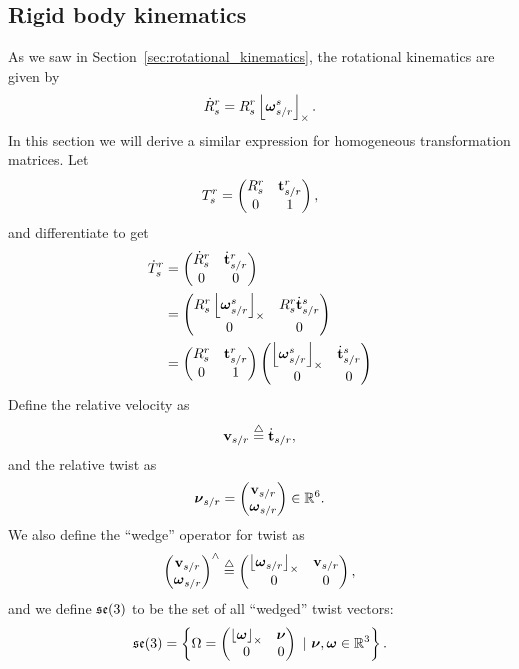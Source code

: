 \subsection{Rigid body kinematics}
As we saw in Section~\ref{sec:rotational_kinematics}, the rotational kinematics are given by
\begin{equation}\label{eq:rotational_dynamics_kinematics}
\dot{R}_s^r = R_s^r \ss{\omegabf_{s/r}^s}.
\end{equation}
In this section we will derive a similar expression for homogeneous transformation matrices.  
Let
\[
T_s^r = \begin{pmatrix} R_s^r & \mathbf{t}_{s/r}^r \\ 0 & 1 \end{pmatrix},
\]
and differentiate to get
\begin{align*}
\dot{T}_s^r &= \begin{pmatrix} \dot{R}_s^r & \dot{\mathbf{t}}_{s/r}^r \\ 0 & 0 \end{pmatrix} \\
&= \begin{pmatrix} R_s^r\left\lfloor\boldsymbol{\omega}_{s/r}^s\right\rfloor_{\times} & R_s^r\dot{\mathbf{t}}_{s/r}^s \\ 0 & 0 \end{pmatrix} \\
&= \begin{pmatrix} R_s^r & \mathbf{t}_{s/r}^r \\ 0 & 1 \end{pmatrix} \begin{pmatrix} \left\lfloor\boldsymbol{\omega}_{s/r}^s\right\rfloor_{\times} & \dot{\mathbf{t}}_{s/r}^s \\ 0 & 0 \end{pmatrix}
\end{align*}
Define the relative velocity as
\[
\mathbf{v}_{s/r} \stackrel{\triangle}{=} \dot{\mathbf{t}}_{s/r},
\]
and the relative twist as
\[
\boldsymbol{\nu}_{s/r} = \begin{pmatrix} \mathbf{v}_{s/r} \\ \boldsymbol{\omega}_{s/r} \end{pmatrix} \in \mathbb{R}^6.
\]
We also define the ``wedge'' operator for twist as 
\[
\begin{pmatrix} \mathbf{v}_{s/r} \\ \boldsymbol{\omega}_{s/r} \end{pmatrix}^\wedge \stackrel{\triangle}{=} \begin{pmatrix} \left\lfloor\boldsymbol{\omega}_{s/r}\right\rfloor_{\times} & \mathbf{v}_{s/r} \\ 0 & 0 \end{pmatrix},
\]
and we define $\mathfrak{se}(3)$ to be the set of all ``wedged'' twist vectors:
\[
\mathfrak{se}(3) = \left\{ \Omega = \begin{pmatrix}\left\lfloor\boldsymbol{\omega}\right\rfloor_{\times} & \boldsymbol{\nu} \\ 0 & 0\end{pmatrix} ~|~ \boldsymbol{\nu}, \boldsymbol{\omega} \in \mathbb{R}^3 \right\}.
\] 

